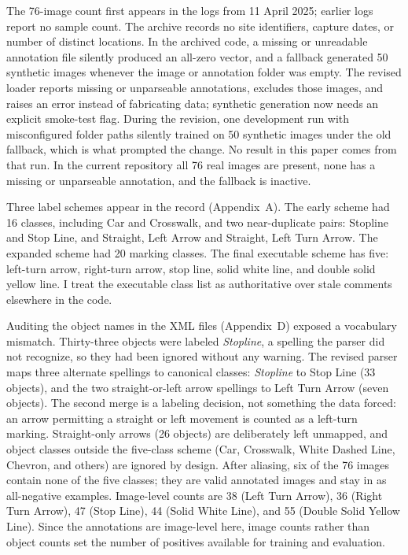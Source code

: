 \documentclass[11pt]{article}
\begin{document}
The 76-image count first appears in the logs from 11 April 2025; earlier logs report no sample count. The archive records no site identifiers, capture dates, or number of distinct locations. In the archived code, a missing or unreadable annotation file silently produced an all-zero vector, and a fallback generated 50 synthetic images whenever the image or annotation folder was empty. The revised loader reports missing or unparseable annotations, excludes those images, and raises an error instead of fabricating data; synthetic generation now needs an explicit smoke-test flag. During the revision, one development run with misconfigured folder paths silently trained on 50 synthetic images under the old fallback, which is what prompted the change. No result in this paper comes from that run. In the current repository all 76 real images are present, none has a missing or unparseable annotation, and the fallback is inactive.

Three label schemes appear in the record (Appendix~A). The early scheme had 16 classes, including Car and Crosswalk, and two near-duplicate pairs: Stopline and Stop Line, and Straight, Left Arrow and Straight, Left Turn Arrow. The expanded scheme had 20 marking classes. The final executable scheme has five: left-turn arrow, right-turn arrow, stop line, solid white line, and double solid yellow line. I treat the executable class list as authoritative over stale comments elsewhere in the code.

Auditing the object names in the XML files (Appendix~D) exposed a vocabulary mismatch. Thirty-three objects were labeled \emph{Stopline}, a spelling the parser did not recognize, so they had been ignored without any warning. The revised parser maps three alternate spellings to canonical classes: \emph{Stopline} to Stop Line (33 objects), and the two straight-or-left arrow spellings to Left Turn Arrow (seven objects). The second merge is a labeling decision, not something the data forced: an arrow permitting a straight or left movement is counted as a left-turn marking. Straight-only arrows (26 objects) are deliberately left unmapped, and object classes outside the five-class scheme (Car, Crosswalk, White Dashed Line, Chevron, and others) are ignored by design. After aliasing, six of the 76 images contain none of the five classes; they are valid annotated images and stay in as all-negative examples. Image-level counts are 38 (Left Turn Arrow), 36 (Right Turn Arrow), 47 (Stop Line), 44 (Solid White Line), and 55 (Double Solid Yellow Line). Since the annotations are image-level here, image counts rather than object counts set the number of positives available for training and evaluation.
\end{document}
